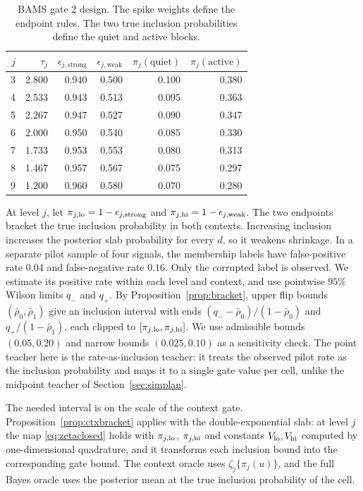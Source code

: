 \documentclass[11pt]{article}
\theoremstyle{plain}
\theoremstyle{definition}
\theoremstyle{remark}
\begin{document}
\begin{table}[!htbp]
\centering
\small
\caption{BAMS gate 2 design. The spike weights define the endpoint rules. The two true inclusion probabilities define the quiet and active blocks.}
\label{tab:bams2-design}
\begin{tabular}{rrrrrr}
\toprule
$j$ & $\tau_j$ & $\epsilon_{j,\mathrm{strong}}$ & $\epsilon_{j,\mathrm{weak}}$ & $\pi_j(\mathrm{quiet})$ & $\pi_j(\mathrm{active})$ \\
\midrule
3 & 2.800 & 0.940 & 0.500 & 0.100 & 0.380 \\
4 & 2.533 & 0.943 & 0.513 & 0.095 & 0.363 \\
5 & 2.267 & 0.947 & 0.527 & 0.090 & 0.347 \\
6 & 2.000 & 0.950 & 0.540 & 0.085 & 0.330 \\
7 & 1.733 & 0.953 & 0.553 & 0.080 & 0.313 \\
8 & 1.467 & 0.957 & 0.567 & 0.075 & 0.297 \\
9 & 1.200 & 0.960 & 0.580 & 0.070 & 0.280 \\
\bottomrule
\end{tabular}
\end{table}

At level $j$, let $\pi_{j,\rm lo}=1-\epsilon_{j,\mathrm{strong}}$ and
$\pi_{j,\rm hi}=1-\epsilon_{j,\mathrm{weak}}$. The two endpoints bracket the
true inclusion probability in both contexts. Increasing inclusion
increases the posterior slab probability for every $d$, so it weakens
shrinkage. In a separate pilot sample of four signals, the membership
labels have false-positive rate $0.04$ and false-negative rate $0.16$.
Only the corrupted label is observed. We estimate its positive rate
within each level and context, and use pointwise $95\%$ Wilson limits
$q_-$ and $q_+$. By Proposition~\ref{prop:bracket}, upper flip bounds
$(\bar\rho_0,\bar\rho_1)$ give an inclusion interval with ends
$(q_--\bar\rho_0)/(1-\bar\rho_0)$ and $q_+/(1-\bar\rho_1)$, each clipped
to $[\pi_{j,\rm lo},\pi_{j,\rm hi}]$. We use admissible bounds $(0.05,0.20)$ and
narrow bounds $(0.025,0.10)$ as a sensitivity check. The point teacher here is the
rate-as-inclusion teacher: it treats the observed pilot rate as the inclusion probability and
maps it to a single gate value per cell, unlike the midpoint teacher of
Section~\ref{sec:simplan}.

The needed interval is on the scale of the context gate. Proposition~\ref{prop:ctxbracket}
applies with the double-exponential slab: at level $j$ the map \eqref{eq:zetaclosed} holds with
$\pi_{j,\rm lo}$, $\pi_{j,\rm hi}$ and constants $V_{\rm lo},V_{\rm hi}$ computed by
one-dimensional quadrature, and it transforms each inclusion bound into the corresponding gate
bound. The context oracle uses $\zeta_j\{\pi_j(u)\}$, and the full Bayes oracle uses the
posterior mean at the true inclusion probability of the cell.
\end{document}

